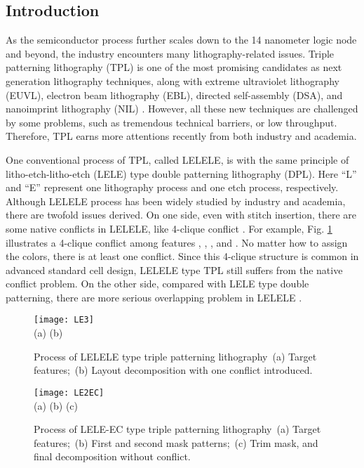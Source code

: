 \documentclass[12pt]{spieman}
\theoremstyle{plain}
\begin{document}
\begin{spacing}{1}   

\section{Introduction}
\label{sec:tplec_intro}


As the semiconductor process further scales down to the 14 nanometer logic node and beyond, the industry encounters many lithography-related issues.
Triple patterning lithography (TPL) \cite{TPL_SPIE2012_Lucas} is one of the most promising candidates as next generation lithography techniques,
along with extreme ultraviolet lithography (EUVL), electron beam lithography (EBL), directed self-assembly (DSA), and nanoimprint lithography (NIL)
\cite{LITH_TCAD2013_Pan,LITH_ICCAD2012_Yu}.
However, all these new techniques are challenged by some problems, such as tremendous technical barriers, or low throughput.
Therefore, TPL earns more attentions recently from both industry and academia.


One conventional process of TPL, called LELELE, is with the same principle of litho-etch-litho-etch (LELE) type double patterning lithography (DPL).
Here ``L'' and ``E'' represent one lithography process and one etch process, respectively.
Although LELELE process has been widely studied by industry and academia, there are twofold issues derived.
On one side, even with stitch insertion, there are some native conflicts in LELELE, like 4-clique conflict \cite{TPL_ICCAD2011_Yu}.
For example, Fig. \ref{fig:tplec_le3} illustrates a 4-clique conflict among features , , , and .
No matter how to assign the colors, there is at least one conflict.
Since this 4-clique structure is common in advanced standard cell design, LELELE type TPL still suffers from the native conflict problem.
On the other side, compared with LELE type double patterning, there are more serious overlapping problem in LELELE \cite{TPL_SPIE08_Ausschnitt}.

\begin{figure}[tb]
  \centering
  \texttt{[image: LE3]}
  \\ (a) \hspace{4.4cm} (b)
  \caption{Process of LELELE type triple patterning lithography~(a) Target features;~(b) Layout decomposition with one conflict introduced.}
  \label{fig:tplec_le3}
\end{figure}


\begin{figure}[tb]
  \centering
  \texttt{[image: LE2EC]}
  \\ (a) \hspace{3.8cm} (b) \hspace{3.8cm} (c)
  \caption{Process of LELE-EC type triple patterning lithography~(a) Target features;~(b) First and second mask patterns;~(c) Trim mask, and final decomposition without conflict.}
  \label{fig:tplec}
\end{figure}


\end{spacing}
\end{document}
